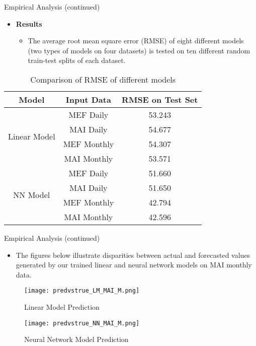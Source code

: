 \documentclass{beamer}
\begin{document}
\begin{frame}{Empirical Analysis (continued)}
    \begin{itemize}
        \item \textbf{Results}
            \begin{itemize}
                \item The average root mean square error (RMSE) of eight different models (two types of models on four datasets) is tested on ten different random train-test splits of each dataset.
            \end{itemize}
    \end{itemize}

    \begin{table}[H]
        \centering
        \begin{tabular}{|c|c|c|}
          \hline
          \textbf{Model} & \textbf{Input Data} & \textbf{RMSE on Test Set} \\ \hline
          \multirow{4}{*}{Linear Model} & MEF Daily & 53.243 \\ \cline{2-3} 
          & MAI Daily & 54.677 \\ \cline{2-3} 
          & MEF Monthly & 54.307 \\ \cline{2-3} 
          & MAI Monthly & 53.571 \\ \hline
          \multirow{4}{*}{NN Model} & MEF Daily & 51.660 \\ \cline{2-3} 
          & MAI Daily & 51.650 \\ \cline{2-3} 
          & MEF Monthly & 42.794 \\ \cline{2-3} 
          & MAI Monthly & 42.596 \\ \hline
        \end{tabular}
        \caption{Comparison of RMSE of different models}
        \label{tab:PerformanceResults}
    \end{table}
\end{frame}


\begin{frame}{Empirical Analysis (continued)}
  \begin{itemize}
    \item The figures below illustrate disparities between actual and forecasted values generated by our trained linear and neural network models on MAI monthly data.
  \end{itemize}

  \begin{figure}[H]
    \centering
    \begin{minipage}{0.48\textwidth}
      \centering
      \texttt{[image: predvstrue\_LM\_MAI\_M.png]}
      \caption{Linear Model Prediction}
      \label{fig:linear_prediction}
    \end{minipage}\hfill
    \begin{minipage}{0.48\textwidth}
      \centering
      \texttt{[image: predvstrue\_NN\_MAI\_M.png]}
      \caption{Neural Network Model Prediction}
      \label{fig:nn_prediction}
    \end{minipage}
  \end{figure}
\end{frame}
\end{document}
